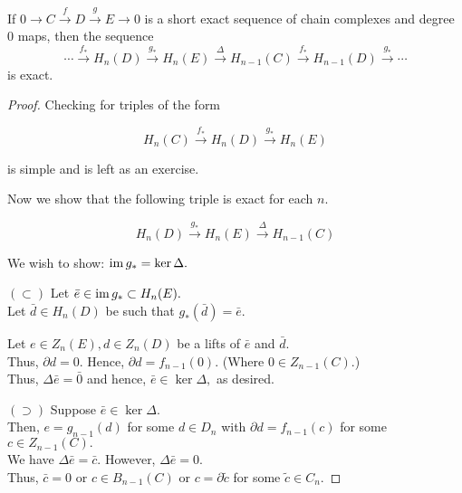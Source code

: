 \documentclass[12pt]{article}
\begin{document}
\begin{thm} \label{thm:snake}
	If $0\overset{}{\longrightarrow} C \overset{f}{\longrightarrow} D \overset{g}{\longrightarrow} E \overset{}{\longrightarrow} 0$ is a short exact sequence of chain complexes and degree $0$ maps, then the sequence
	\begin{equation*} 
		\cdots\overset{f_*}{\longrightarrow}H_n(D)\overset{g_*}{\longrightarrow}H_n(E)\overset{\Delta}{\longrightarrow}H_{n-1}(C)\overset{f_*}{\longrightarrow}H_{n-1}(D)\overset{g_*}{\longrightarrow}\cdots
	\end{equation*}
	is exact.
\end{thm}

\begin{proof} 
	Checking for triples of the form

	\begin{equation*} 
		H_n(C) \overset{f_*}{\longrightarrow} H_n(D) \overset{g_*}{\longrightarrow} H_n(E)
	\end{equation*}
	
	is simple and is left as an exercise.
	
	\dotfill

	Now we show that the following triple is exact for each $n.$
	
	\begin{equation*} 
		H_n(D)\overset{g_*}{\longrightarrow}H_n(E)\overset{\Delta}{\longrightarrow}H_{n-1}(C)
	\end{equation*}

	We wish to show: $\operatorname{im} g_* = \ker\Delta.$

	$(\subset)$ Let $\bar{e} \in \operatorname{im} g_* \subset H_n(E).$\\
	Let $\bar{d} \in H_n(D)$ be such that $g_*(\bar{d}) = \bar{e}.$

	Let $e \in Z_n(E), d \in Z_n(D)$ be a lifts of $\bar{e}$ and $\bar{d}.$ \\
	Thus, $\partial d = 0.$ Hence, $\partial d = f_{n-1}(0).$ (Where $0 \in Z_{n-1}(C).$) \\
	Thus, $\Delta \bar{e} = \bar{0}$ and hence, $\bar{e} \in \ker \Delta,$ as desired.

	$(\supset)$ Suppose $\bar{e} \in \ker \Delta.$ \\
	Then, $e = g_{n-1}(d)$ for some $d \in D_n$ with $\partial d = f_{n-1}(c)$ for some $c \in Z_{n-1}(C).$\\
	We have $\Delta \bar{e} = \bar{c}.$ However, $\Delta \bar{e} = 0.$\\
	Thus, $\bar{c} = 0$ or $c \in B_{n-1}(C)$ or $c = \partial\tilde{c}$ for some $\tilde{c} \in C_n.$


\end{proof}
\end{document}
